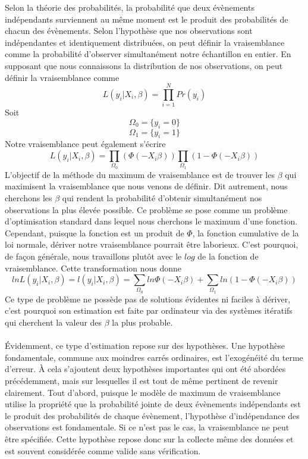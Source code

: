 \documentclass[a4paper, oneside, titlepage]{article}
\begin{document}
Selon la théorie des probabilités, la probabilité que deux évènements indépendants surviennent au même moment est le produit des probabilités de chacun des évènements. Selon l'hypothèse que nos observations sont indépendantes et identiquement distribuées, on peut définir la vraisemblance comme la probabilité d'observer simultanément notre échantillon en entier. En supposant que nous connaissons la distribution de nos observations, on peut définir la vraisemblance comme
\[L(y_i|X_i,\beta)=\prod_{i=1}^{N}Pr(y_i)\]
Soit
\[\Omega_0=\{y_i=0\}\]
\[\Omega_1=\{y_i=1\}\]
Notre vraisemblance peut également s'écrire
\[L(y_i|X_i,\beta)=\prod_{\Omega_0} (\Phi(-X_i\beta))\prod_{\Omega_1}(1-\Phi(-X_i\beta))\]
L'objectif de la méthode du maximum de vraisemblance est de trouver les $\beta$ qui maximisent la vraisemblance que nous venons de définir. Dit autrement, nous cherchons les $\beta$ qui rendent la probabilité d'obtenir simultanément nos observations la plus élevée possible. Ce problème se pose comme un problème d'optimisation standard dans lequel nous cherchons le maximum d'une fonction. Cependant, puisque la fonction est un produit de $\Phi$, la fonction cumulative de la loi normale, dériver notre vraisemblance pourrait être laborieux. C'est pourquoi, de façon générale, nous travaillons plutôt avec le $log$ de la fonction de vraisemblance. Cette transformation nous donne 
\[ln L(y_i|X_i,\beta)= l(y_i|X_i,\beta)=\sum_{\Omega_0}ln\Phi(-X_i\beta)+\sum_{\Omega_1}ln(1-\Phi(-X_i\beta))\]
Ce type de problème ne possède pas de solutions évidentes ni faciles à dériver, c'est pourquoi son estimation est faite par ordinateur via des systèmes itératifs qui cherchent la valeur des $\beta$ la plus probable.
\\
\\
Évidemment, ce type d'estimation repose sur des hypothèses. Une hypothèse fondamentale, commune aux moindres carrés ordinaires, est l'exogénéité du terme d'erreur. À cela s'ajoutent deux hypothèses importantes qui ont été abordées précédemment, mais sur lesquelles il est tout de même pertinent de revenir clairement. Tout d'abord, puisque le modèle de maximum de vraisemblance utilise la propriété que la probabilité jointe de deux évènements indépendants est le produit des probabilités de chaque évènement, l'hypothèse d'indépendance des observations est fondamentale. Si ce n'est pas le cas, la vraisemblance ne peut être spécifiée. Cette hypothèse repose donc sur la collecte même des données et est souvent considérée comme valide sans vérification. 
\\
\end{document}

